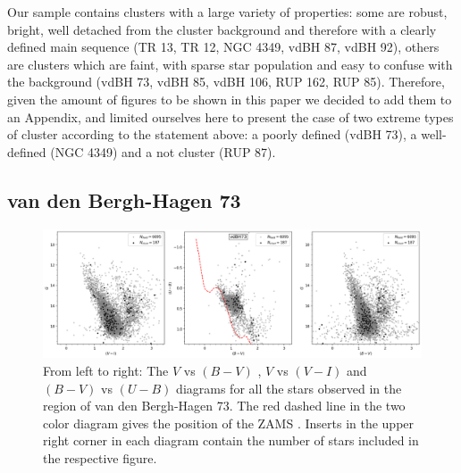 \documentclass[draft]{aa}
\begin{document}
Our sample contains clusters with a large variety of properties: some are
robust, bright, well detached from the cluster background and therefore with a
clearly defined main sequence (TR 13, TR 12, NGC 4349, vdBH 87, vdBH 92),
others are clusters which are faint, with sparse star population and easy to
confuse with the background (vdBH 73, vdBH 85, vdBH 106, RUP 162, RUP 85).
Therefore, given the amount of figures to be shown in this paper we decided to
add them to an Appendix, and limited ourselves here to present
the case of two extreme types of cluster according to the statement above: a
poorly defined (vdBH 73), a well-defined (NGC 4349) and a not cluster 
(RUP 87).


\subsection{van den Bergh-Hagen 73}

\begin{figure}[ht]
    \centering
    \includegraphics[width=\hsize]{../figs/obs_vdBH73.png}
    \caption{From left to right: The $V$ vs $(B-V)$ , $V$ vs $(V-I)$ and
    $(B-V)$ vs $(U-B)$ diagrams for all the stars observed in the region of van
    den Bergh-Hagen 73.
    The red dashed line in the two color diagram gives the position of the ZAMS
    \citep{Aller1982}. Inserts in the upper right corner in each
    diagram contain the number of stars included in the respective figure.}
    \label{fig3}
\end{figure}
\end{document}
